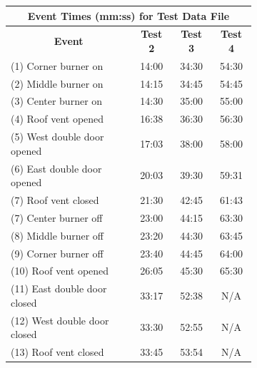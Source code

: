 \documentclass[12pt,oneside]{book}
\begin{document}
\begin{figure}[!ht]
\begin{minipage}[b]{0.8\columnwidth}
	\begin{flushleft}
	\small
\begin{figure}[!ht]
\begin{minipage}[b]{0.8\columnwidth}
	\begin{flushleft}
	\small
	\begin{tabular}{lccc}
\multicolumn{4}{c}{\normalsize Event Times (mm:ss) for Test Data File} \\
\toprule
\multicolumn{1}{c}{\textbf{Event}} & \textbf{Test 2} & \textbf{Test 3} & \textbf{Test 4} \\
\midrule
(1) Corner burner on 			& 	14:00		  &	   34:30		&	   54:30	\\
(2) Middle burner on 			&   14:15		  &	   34:45		&	   54:45	\\
(3) Center burner on 			&   14:30		  &	   35:00		&	   55:00	\\
(4) Roof vent opened 			&   16:38		  &    36:30		&	   56:30	\\
(5) West double door opened 	&	17:03		  &	   38:00 		&	   58:00 	\\
(6) East double door opened 	&   20:03		  &    39:30		&	   59:31	\\
(7) Roof vent closed		 	&   21:30		  &    42:45		&	   61:43	\\
(7) Center burner off 			&   23:00		  &    44:15		&	   63:30	\\
(8) Middle burner off 			&   23:20		  &    44:30		&	   63:45	\\
(9) Corner burner off 			&   23:40		  &    44:45		&	   64:00	\\
(10) Roof vent opened			& 	26:05 		  &	   45:30		&	   65:30	\\
(11) East double door closed	& 	33:17 		  &	   52:38		&	   N/A	\\
(12) West double door closed	& 	33:30 		  &	   52:55		&	   N/A	\\
(13) Roof vent closed		 	&   33:45		  &    53:54		&	   N/A	\\
\bottomrule
\end{tabular}


\end{flushleft}
\end{minipage}
\end{figure}
\end{flushleft}
\end{minipage}
\end{figure}
\end{document}
